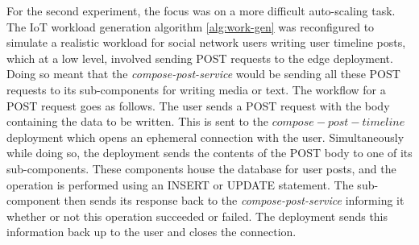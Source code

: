 For the second experiment, the focus was on a more difficult auto-scaling task. The IoT workload generation algorithm \ref{alg:work-gen} was reconfigured to simulate a realistic workload for social network users writing user timeline posts, which at a low level, involved sending POST requests to the edge deployment. Doing so meant that the \textit{compose-post-service} would be sending all these POST requests to its sub-components for writing media or text. The workflow for a POST request goes as follows. The user sends a POST request with the body containing the data to be written. This is sent to the $compose-post-timeline$ deployment which opens an ephemeral connection with the user. Simultaneously while doing so, the deployment sends the contents of the POST body to one of its sub-components. These components house the database for user posts, and the operation is performed using an INSERT or UPDATE statement. The sub-component then sends its response back to the \textit{compose-post-service} informing it whether or not this operation succeeded or failed. The deployment sends this information back up to the user and closes the connection.\par

